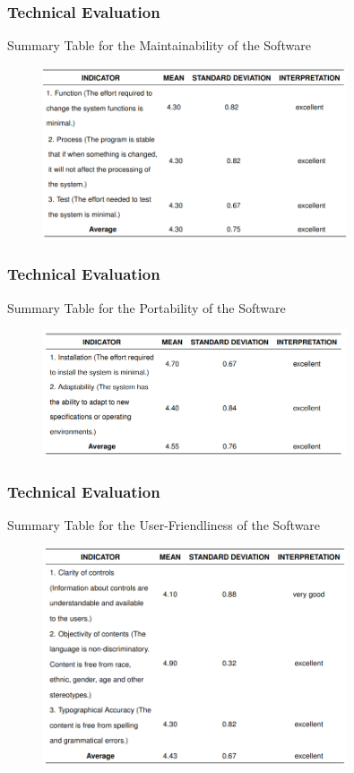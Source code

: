 \documentclass[handout]{beamer}
\begin{document}
\begin{frame}
	\frametitle{Technical Evaluation}
	\begin{block}{Summary Table for the Maintainability of the Software}
		\begin{figure}
			\includegraphics[width=0.8\textwidth]{figures/res_tech_maintainability.png}
		\end{figure}
	\end{block}
\end{frame}

\begin{frame}
	\frametitle{Technical Evaluation}
	\begin{block}{Summary Table for the Portability of the Software}
		\begin{figure}
			\includegraphics[width=0.8\textwidth]{figures/res_tech_portability.png}
		\end{figure}
	\end{block}
\end{frame}

\begin{frame}
	\frametitle{Technical Evaluation}
	\begin{block}{Summary Table for the User-Friendliness of the Software}
		\begin{figure}
			\includegraphics[width=0.8\textwidth]{figures/res_tech_uf.png}
		\end{figure}
	\end{block}
\end{frame}
\end{document}
